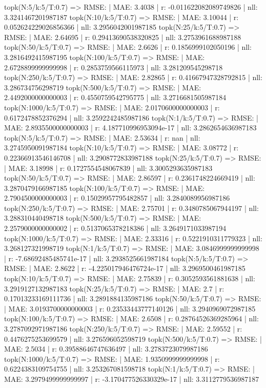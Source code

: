 topk(N:5/k:5/T:0.7) => RMSE: | MAE: 3.4038 | r: -0.011622082089749826 | nll: 3.3241467201987187
topk(N:10/k:5/T:0.7) => RMSE: | MAE: 3.10044 | r: 0.052624229026856366 | nll: 3.2956042001987185
topk(N:25/k:5/T:0.7) => RMSE: | MAE: 2.64695 | r: 0.29413690538320825 | nll: 3.2753961688987188
topk(N:50/k:5/T:0.7) => RMSE: | MAE: 2.6626 | r: 0.1856999102050196 | nll: 3.2816492415987195
topk(N:100/k:5/T:0.7) => RMSE: | MAE: 2.6728899999999998 | r: 0.2853759566115973 | nll: 3.281209545298718
topk(N:250/k:5/T:0.7) => RMSE: | MAE: 2.82865 | r: 0.41667947328792815 | nll: 3.286734756298719
topk(N:500/k:5/T:0.7) => RMSE: | MAE: 2.4492000000000003 | r: 0.4550759542795775 | nll: 3.2716681505987184
topk(N:1000/k:5/T:0.7) => RMSE: | MAE: 2.0170600000000003 | r: 0.6172478852376294 | nll: 3.2592242485987186
topk(N:1/k:5/T:0.7) => RMSE: | MAE: 2.8935500000000003 | r: 4.187710996953094e-17 | nll: 3.2862654636987183
topk(N:5/k:5/T:0.7) => RMSE: | MAE: 2.53634 | r: nan | nll: 3.2745950091987184
topk(N:10/k:5/T:0.7) => RMSE: | MAE: 3.08772 | r: 0.22366913546146708 | nll: 3.2908772833987188
topk(N:25/k:5/T:0.7) => RMSE: | MAE: 3.18998 | r: 0.1727554548067839 | nll: 3.3005293635987183
topk(N:50/k:5/T:0.7) => RMSE: | MAE: 2.86597 | r: 0.2361748224669419 | nll: 3.2870479166987185
topk(N:100/k:5/T:0.7) => RMSE: | MAE: 2.7904500000000003 | r: 0.15029957795482857 | nll: 3.2840089956987186
topk(N:250/k:5/T:0.7) => RMSE: | MAE: 2.75701 | r: 0.3480785067944197 | nll: 3.288310440498718
topk(N:500/k:5/T:0.7) => RMSE: | MAE: 2.2579000000000002 | r: 0.5137065378218386 | nll: 3.2649171033987194
topk(N:1000/k:5/T:0.7) => RMSE: | MAE: 2.33316 | r: 0.5221910311779323 | nll: 3.268127321998719
topk(N:1/k:5/T:0.7) => RMSE: | MAE: 3.0846999999999998 | r: -7.68692485485741e-17 | nll: 3.2938525661987184
topk(N:5/k:5/T:0.7) => RMSE: | MAE: 2.8622 | r: -4.225017946476724e-17 | nll: 3.2969500461987185
topk(N:10/k:5/T:0.7) => RMSE: | MAE: 2.75839 | r: 0.3052593561881638 | nll: 3.2919127132987183
topk(N:25/k:5/T:0.7) => RMSE: | MAE: 2.7 | r: 0.17013233169111736 | nll: 3.2891884135987186
topk(N:50/k:5/T:0.7) => RMSE: | MAE: 3.0193700000000003 | r: 0.23533443777140126 | nll: 3.2940969072987185
topk(N:100/k:5/T:0.7) => RMSE: | MAE: 2.6508 | r: 0.28764526369285964 | nll: 3.2787092971987186
topk(N:250/k:5/T:0.7) => RMSE: | MAE: 2.59552 | r: 0.4476275253699579 | nll: 3.276596052598719
topk(N:500/k:5/T:0.7) => RMSE: | MAE: 2.5034 | r: 0.39588646747636497 | nll: 3.2783723079987186
topk(N:1000/k:5/T:0.7) => RMSE: | MAE: 1.9350999999999998 | r: 0.6224383109754755 | nll: 3.253267081598718
topk(N:1/k:5/T:0.7) => RMSE: | MAE: 3.2979499999999997 | r: -3.170477526330329e-17 | nll: 3.3112779536987187
